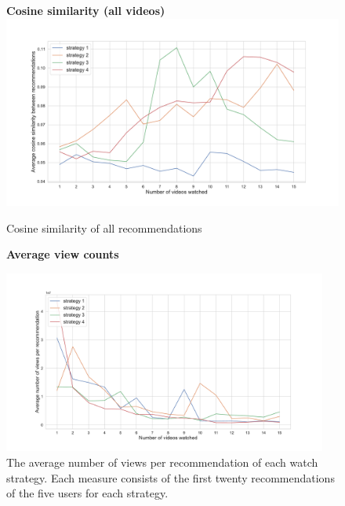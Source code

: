 \begin{appendices}
\begin{figure}
\textbf{Cosine similarity (all videos)}
\centering
\includegraphics[width=\textwidth]{images/All sim.pdf}
\caption{Cosine similarity of all recommendations}
\label{appendix:all_sim}
\end{figure}

\begin{figure}[!t]
  \textbf{Average view counts}\par\medskip
  \centering
  \includegraphics[keepaspectratio, width=0.95\textwidth]{images/views.pdf}
  \caption{The average number of views per recommendation of each watch strategy. Each measure consists of the first twenty recommendations of the five users for each strategy.}
  \label{appendix:views}
\end{figure}



\end{appendices}
